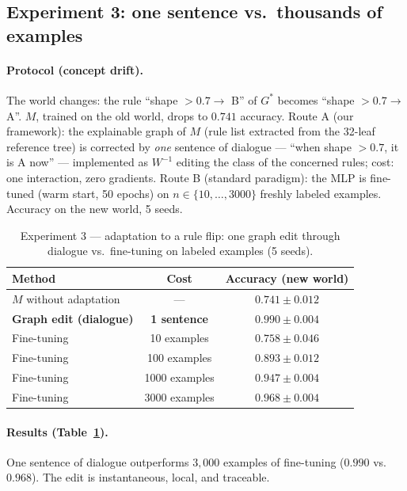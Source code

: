 \documentclass[10pt]{article}
\theoremstyle{definition}
\theoremstyle{plain}
\begin{document}
\subsection{Experiment 3: one sentence vs.\ thousands of examples}
\label{sec:exp3}

\paragraph{Protocol (concept drift).} The world changes: the rule ``shape $> 0.7 \to$ B'' of $G^\ast$ becomes ``shape $> 0.7 \to$ A''. $M$, trained on the old world, drops to $0.741$ accuracy. Route A (our framework): the explainable graph of $M$ (rule list extracted from the 32-leaf reference tree) is corrected by \emph{one} sentence of dialogue --- ``when shape $> 0.7$, it is A now'' --- implemented as $W^{-1}$ editing the class of the concerned rules; cost: one interaction, zero gradients. Route B (standard paradigm): the MLP is fine-tuned (warm start, 50 epochs) on $n \in \{10, \dots, 3000\}$ freshly labeled examples. Accuracy on the new world, 5 seeds.

\begin{table}[t]
\centering
\footnotesize
\caption{Experiment 3 --- adaptation to a rule flip: one graph edit through dialogue vs.\ fine-tuning on labeled examples (5 seeds).}
\label{tab:exp3}
\begin{tabular}{lcc}
\toprule
Method & Cost & Accuracy (new world) \\
\midrule
$M$ without adaptation & --- & $0.741{\pm}0.012$ \\
\textbf{Graph edit (dialogue)} & \textbf{1 sentence} & $\mathbf{0.990{\pm}0.004}$ \\
Fine-tuning & 10 examples & $0.758{\pm}0.046$ \\
Fine-tuning & 100 examples & $0.893{\pm}0.012$ \\
Fine-tuning & 1000 examples & $0.947{\pm}0.004$ \\
Fine-tuning & 3000 examples & $0.968{\pm}0.004$ \\
\bottomrule
\end{tabular}
\end{table}

\paragraph{Results (Table~\ref{tab:exp3}).} One sentence of dialogue outperforms $3{,}000$ examples of fine-tuning ($0.990$ vs.\ $0.968$). The edit is instantaneous, local, and traceable.
\end{document}
